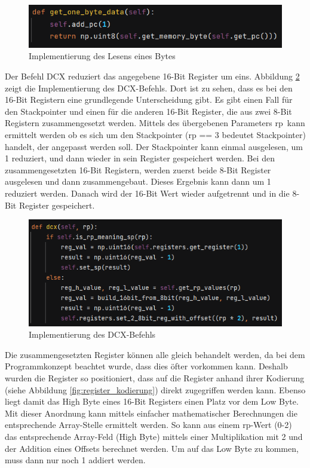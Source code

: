 \documentclass[12pt]{article}
\newcommand{\imgSpaceBefore}{\vspace{10pt}}
\begin{document}
\imgSpaceBefore
\begin{figure}[h]
\centering
\includegraphics[width=15cm]{Bilder/GetOneByteData}
\caption{Implementierung des Lesens eines Bytes}
\label{fig:GetOneByteData}
\end{figure}

\noindent
Der Befehl DCX reduziert das angegebene 16-Bit Register um eins. Abbildung \ref{fig:dcx_impl} zeigt die Implementierung des DCX-Befehls.
Dort ist zu sehen, dass es bei den 16-Bit Registern eine grundlegende Unterscheidung gibt. Es gibt einen Fall für den Stackpointer und einen für die anderen 16-Bit Register, die aus zwei 8-Bit Registern zusammengesetzt werden. Mittels des übergebenen Parameters \glqq rp\grqq\ kann ermittelt werden ob es sich um den Stackpointer (rp  == 3 bedeutet Stackpointer) handelt, der angepasst werden soll.
Der Stackpointer kann einmal ausgelesen, um 1 reduziert, und dann wieder in sein Register gespeichert werden.
Bei den zusammengesetzten 16-Bit Registern, werden zuerst beide 8-Bit Register ausgelesen und dann zusammengebaut. Dieses Ergebnis kann dann um 1 reduziert werden. Danach wird der 16-Bit Wert wieder aufgetrennt und in die 8-Bit Register gespeichert. 

\imgSpaceBefore
\begin{figure}[H]
\centering
\includegraphics[width=15cm]{Bilder/dcx_impl}
\caption{Implementierung des DCX-Befehls}
\label{fig:dcx_impl}
\end{figure}

\noindent
Die zusammengesetzten Register können alle gleich behandelt werden, da bei dem Programmkonzept beachtet wurde, dass dies öfter vorkommen kann. Deshalb wurden die Register so positioniert, dass auf die Register anhand ihrer Kodierung (siehe Abbildung \ref{fig:register_kodierung}) direkt zugegriffen werden kann. Ebenso liegt damit das High Byte eines 16-Bit Registers einen Platz vor dem Low Byte. Mit dieser Anordnung kann mittels einfacher mathematischer Berechnungen die entsprechende Array-Stelle ermittelt werden. So kann aus einem rp-Wert (0-2) das entsprechende Array-Feld (High Byte) mittels einer Multiplikation mit 2 und der Addition eines Offsets berechnet werden. Um auf das Low Byte zu kommen, muss dann nur noch 1 addiert werden.
\end{document}

